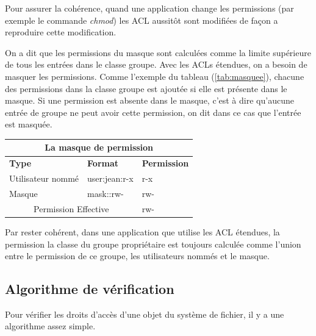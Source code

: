 \documentclass{article}
\begin{document}
 
Pour assurer la cohérence, quand une application change les permissions (par exemple le commande \emph{chmod}) les ACL aussitôt sont modifiées de façon a reproduire cette modification.
 
On a dit que les permissions du masque sont calculées comme la limite supérieure de tous les entrées dans le classe groupe. Avec les ACLs étendues, on a besoin de masquer les permissions. Comme l'exemple du tableau (\ref{tab:masquee}), chacune des permissions dans la classe groupe est ajoutée si elle est présente dans le masque. Si une permission est absente dans le masque, c'est à dire qu'aucune entrée de groupe ne peut avoir cette permission, on dit dans ce cas que l'entrée est masquée.
 
\begin{center}
\begin{tabular}{|l|l|l|}
  \hline
    \multicolumn{3}{|c|}{La masque de permission} \\
  \hline
\textbf{Type} & \textbf{Format} & \textbf{Permission} \\
  \hline
Utilisateur nommé & user:jean:r-x & r-x\\
  \hline
Masque & mask::rw- & rw-\\
  \hline
\multicolumn{2}{|c|}{Permission Effective} & rw-\\
  \hline
\end{tabular}
\label{tab:masque}
\end{center}


Par rester cohérent, dans une application que utilise les ACL étendues, la permission la classe du groupe propriétaire est toujours calculée comme l'union entre le permission de ce groupe, les utilisateurs nommés et le masque.  
 
\subsection{Algorithme de vérification}
 
Pour vérifier les droits d'accès d'une objet du système de fichier, il y a une algorithme assez simple.
 
\end{document}
